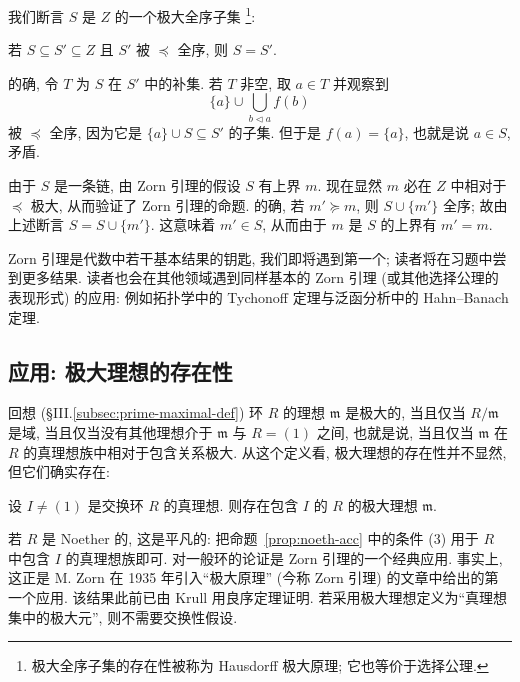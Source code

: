 \noindent 我们断言 $S$ 是 $Z$ 的一个极大全序子集%
\footnote{极大全序子集的存在性被称为 Hausdorff 极大原理; 它也等价于选择公理.}:

\begin{claim}\label{claim:maximal-chain}
若 $S\subseteq S'\subseteq Z$ 且 $S'$ 被 $\preceq$ 全序, 则 $S=S'$.
\end{claim}

\noindent 的确, 令 $T$ 为 $S$ 在 $S'$ 中的补集. 若 $T$ 非空, 取 $a\in T$ 并观察到
\[
\{a\}\cup \bigcup_{b\lhd a} f(b)
\]
被 $\preceq$ 全序, 因为它是 $\{a\}\cup S\subseteq S'$ 的子集. 但于是 $f(a)=\{a\}$, 也就是说 $a\in S$, 矛盾.

\noindent 由于 $S$ 是一条链, 由 Zorn 引理的假设 $S$ 有上界 $m$. 现在显然 $m$ 必在 $Z$ 中相对于 $\preceq$ 极大, 从而验证了 Zorn 引理的命题. 的确, 若 $m'\succeq m$, 则 $S\cup\{m'\}$ 全序; 故由上述断言 $S=S\cup\{m'\}$. 这意味着 $m'\in S$, 从而由于 $m$ 是 $S$ 的上界有 $m'=m$.

\noindent Zorn 引理是代数中若干基本结果的钥匙, 我们即将遇到第一个; 读者将在习题中尝到更多结果. 读者也会在其他领域遇到同样基本的 Zorn 引理 (或其他选择公理的表现形式) 的应用: 例如拓扑学中的 Tychonoff 定理与泛函分析中的 Hahn--Banach 定理.

\subsection{应用: 极大理想的存在性}
\label{subsec:maximal-ideals-existence}

回想 (§III.\ref{subsec:prime-maximal-def}) 环 $R$ 的理想 $\mathfrak{m}$ 是极大的, 当且仅当 $R/\mathfrak{m}$ 是域, 当且仅当没有其他理想介于 $\mathfrak{m}$ 与 $R=(1)$ 之间, 也就是说, 当且仅当 $\mathfrak{m}$ 在 $R$ 的真理想族中相对于包含关系极大. 从这个定义看, 极大理想的存在性并不显然, 但它们确实存在:

\begin{proposition}\label{prop:maximal-ideal-exists}
设 $I\neq (1)$ 是交换环 $R$ 的真理想. 则存在包含 $I$ 的 $R$ 的极大理想 $\mathfrak{m}$.
\end{proposition}

\noindent 若 $R$ 是 Noether 的, 这是平凡的: 把命题~\ref{prop:noeth-acc} 中的条件 (3) 用于 $R$ 中包含 $I$ 的真理想族即可. 对一般环的论证是 Zorn 引理的一个经典应用. 事实上, 这正是 M. Zorn 在 1935 年引入``极大原理'' (今称 Zorn 引理) 的文章中给出的第一个应用. 该结果此前已由 Krull 用良序定理证明. 若采用极大理想定义为``真理想集中的极大元'', 则不需要交换性假设.

